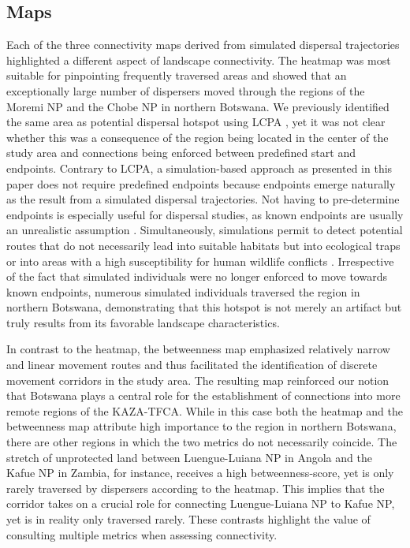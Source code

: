 \documentclass[abstract=on,10pt,a4paper,bibliography=totocnumbered]{article}
\begin{document}
\subsection{Maps}
Each of the three connectivity maps derived from simulated dispersal
trajectories highlighted a different aspect of landscape connectivity. The
heatmap was most suitable for pinpointing frequently traversed areas and showed
that an exceptionally large number of dispersers moved through the regions of
the Moremi NP and the Chobe NP in northern Botswana. We previously identified
the same area as potential dispersal hotspot using LCPA \citep{Hofmann.2021},
yet it was not clear whether this was a consequence of the region being located
in the center of the study area and connections being enforced between
predefined start and endpoints. Contrary to LCPA, a simulation-based approach as
presented in this paper does not require predefined endpoints because endpoints
emerge naturally as the result from a simulated dispersal trajectories. Not
having to pre-determine endpoints is especially useful for dispersal studies, as
known endpoints are usually an unrealistic assumption \citep{Elliot.2014,
Abrahms.2017, Cozzi.2020}. Simultaneously, simulations permit to detect
potential routes that do not necessarily lead into suitable habitats but into
ecological traps \citep{Dwernychuk.1972, VanDerMeer.2014} or into areas with a
high susceptibility for human wildlife conflicts \citep{Cushman.2018}.
Irrespective of the fact that simulated individuals were no longer enforced to
move towards known endpoints, numerous simulated individuals traversed
the region in northern Botswana, demonstrating that this hotspot is not merely
an artifact but truly results from its favorable landscape characteristics.

In contrast to the heatmap, the betweenness map emphasized relatively narrow and
linear movement routes and thus facilitated the identification of discrete
movement corridors in the study area. The resulting map reinforced our notion
that Botswana plays a central role for the establishment of connections into
more remote regions of the KAZA-TFCA. While in this case both the heatmap and
the betweenness map attribute high importance to the region in northern
Botswana, there are other regions in which the two metrics do not necessarily
coincide. The stretch of unprotected land between Luengue-Luiana NP in Angola
and the Kafue NP in Zambia, for instance, receives a high betweenness-score, yet
is only rarely traversed by dispersers according to the heatmap. This implies
that the corridor takes on a crucial role for connecting Luengue-Luiana NP to
Kafue NP, yet is in reality only traversed rarely. These contrasts highlight the
value of consulting multiple metrics when assessing connectivity.
\end{document}
